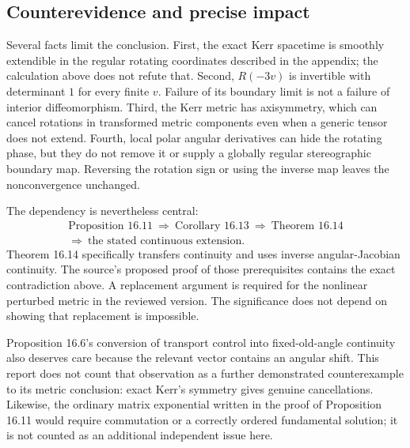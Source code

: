 \documentclass[10pt]{article}
\begin{document}
\subsection*{Counterevidence and precise impact}
Several facts limit the conclusion. First, the exact Kerr spacetime is smoothly extendible in the regular rotating coordinates described in the appendix; the calculation above does not refute that. Second, \(R(-3v)\) is invertible with determinant \(1\) for every finite \(v\). Failure of its boundary limit is not a failure of interior diffeomorphism. Third, the Kerr metric has axisymmetry, which can cancel rotations in transformed metric components even when a generic tensor does not extend. Fourth, local polar angular derivatives can hide the rotating phase, but they do not remove it or supply a globally regular stereographic boundary map. Reversing the rotation sign or using the inverse map leaves the nonconvergence unchanged.\par
The dependency is nevertheless central: \[\begin{gathered}
 \text{Proposition 16.11}
 \ \Longrightarrow\ \text{Corollary 16.13}
 \ \Longrightarrow\ \text{Theorem 16.14}\\
 \Longrightarrow\ \text{the stated continuous extension}.
\end{gathered}\] Theorem 16.14 specifically transfers continuity and uses inverse angular-Jacobian continuity. The source’s proposed proof of those prerequisites contains the exact contradiction above. A replacement argument is required for the nonlinear perturbed metric in the reviewed version. The significance does not depend on showing that replacement is impossible.\par
Proposition 16.6’s conversion of transport control into fixed-old-angle continuity also deserves care because the relevant vector contains an angular shift. This report does not count that observation as a further demonstrated counterexample to its metric conclusion: exact Kerr’s symmetry gives genuine cancellations. Likewise, the ordinary matrix exponential written in the proof of Proposition 16.11 would require commutation or a correctly ordered fundamental solution; it is not counted as an additional independent issue here.\par
\end{document}
